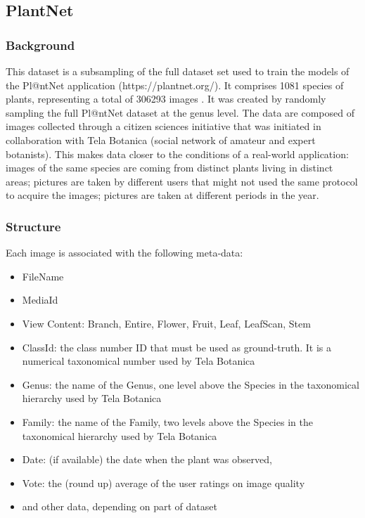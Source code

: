 \documentclass[../Main.tex]{subfiles}
\begin{document}
    
\subsection{PlantNet}
    \subsubsection{Background}
    This dataset is a subsampling of the full dataset set used to train the models of the Pl@ntNet application (https://plantnet.org/). It comprises 1081 species of plants, representing a total of 306293 images \cite{plantnet-db}. It was created by randomly sampling the full Pl@ntNet dataset at the genus level. The data are composed of images collected through a citizen sciences initiative that was initiated in collaboration with Tela Botanica (social network of amateur and expert botanists). This makes data closer to the conditions of a real-world application: images of the same species are coming from distinct plants living in distinct areas; pictures are taken by different users that might not used the same protocol to acquire the images; pictures are taken at different periods in the year. 

    \subsubsection{Structure}
    Each image is associated with the following meta-data: \cite{clef}
    \begin{itemize}
        \item FileName
        \item MediaId
        \item View Content: Branch, Entire, Flower, Fruit, Leaf, LeafScan, Stem
        \item ClassId: the class number ID that must be used as ground-truth. It is a numerical taxonomical number used by Tela Botanica
        \item Genus: the name of the Genus, one level above the Species in the taxonomical hierarchy used by Tela Botanica
        \item Family: the name of the Family, two levels above the Species in the taxonomical hierarchy used by Tela Botanica
        \item Date: (if available) the date when the plant was observed,
        \item Vote: the (round up) average of the user ratings on image quality
        \item and other data, depending on part of dataset
    \end{itemize}
\end{document}
